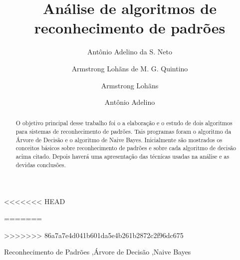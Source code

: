 \documentclass[preprint,12pt,times]{elsarticle}
\begin{document}
	\begin{frontmatter}



		\title{Análise de algoritmos de reconhecimento de padrões}
<<<<<<< HEAD
				
		\author[a]{Antônio Adelino da S. Neto}
		\address[a]{antonio.asn03@gmail.com}
		
		\author[b]{Armstrong Lohãns de M. G. Quintino}
		\address[b]{lohansdemelo1108@gmail.com}
		
=======


		\author[a]{Armstrong Lohãns}
		\address[a]{lohansdemelo1108@gmail.com}

		\author[b]{Antônio Adelino}
		\address[b]{antonio.asn03@gmail.com}

>>>>>>> 86a7a7e4d041b601da5e4b261b2872c2f96dc675
		\address{Garanhuns, Brasil}

		\begin{abstract}
			O objetivo principal desse trabalho foi o a elaboração e o estudo de dois algoritmos para sistemas de reconhecimento de padrões. Tais programas foram o algoritmo da Árvore de Decisão e o algoritmo de Naive Bayes. Inicialmente são mostrados os conceitos básicos sobre reconhecimento de padrões e sobre cada algoritmo de decisão acima citado. Depois haverá uma apresentação das técnicas usadas na análise e as devidas conclusões.
		\end{abstract}

		\begin{keyword}
			Reconhecimento de Padrões \sep Árvore de Decisão \sep Naive Bayes
		\end{keyword}

	\end{frontmatter}
\end{document}
